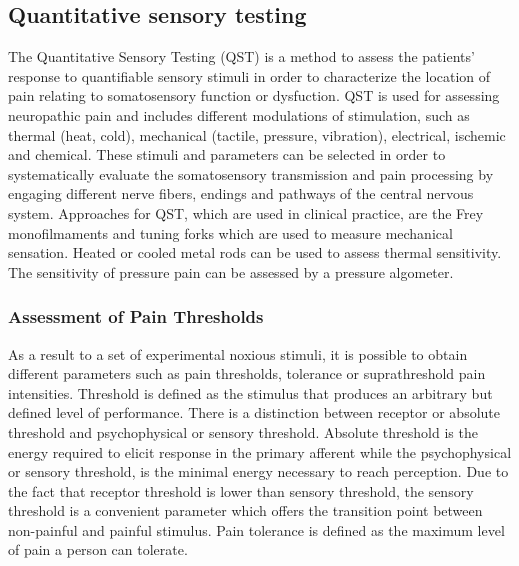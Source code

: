 \subsection{Quantitative sensory testing}
The Quantitative Sensory Testing (QST) is a method to assess the patients' response to quantifiable sensory stimuli in order to characterize the location of pain relating to somatosensory function or dysfuction. QST is used for assessing neuropathic pain and includes different modulations of stimulation, such as thermal (heat, cold), mechanical (tactile, pressure, vibration), electrical, ischemic and chemical. These stimuli and parameters can be selected in order to systematically evaluate the somatosensory transmission and pain processing by engaging different nerve fibers, endings and pathways of the central nervous system. \cite{Fillingim2016} Approaches for QST, which are used in clinical practice, are the Frey monofilmaments and tuning forks which are used to measure mechanical sensation. Heated or cooled metal rods can be used to assess thermal sensitivity. The sensitivity of pressure pain can be assessed by a pressure algometer. \cite{Fillingim2016}


\subsubsection{Assessment of Pain Thresholds}
As a result to a set of experimental noxious stimuli, it is possible to obtain different parameters such as pain thresholds, tolerance or suprathreshold pain intensities. Threshold is defined as the stimulus that produces an arbitrary but defined level of performance. There is a distinction between receptor or absolute threshold and psychophysical or sensory threshold. Absolute threshold is the energy required to elicit response in the primary afferent while the psychophysical or sensory threshold, is the minimal energy necessary to reach perception. Due to the fact that receptor threshold is lower than sensory threshold, the sensory threshold is a convenient parameter which offers the transition point between non-painful and painful stimulus. \cite{Yarnitsky2006} Pain tolerance is defined as the maximum level of pain a person can tolerate.

